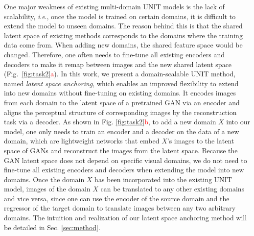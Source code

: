 \documentclass[10pt,journal,compsoc]{IEEEtran}
\newcommand{\red}[1]{\textcolor{red}{#1}}
\newcommand{\ie}{\textit{i}.\textit{e}.}
\begin{document}
One major weakness of existing multi-domain UNIT models is the lack of scalability, \ie, once the model is trained on certain domains, it is difficult to extend the model to unseen domains.
The reason behind this is that the shared latent space of existing methods corresponds to the domains where the training data come from. When adding new domains, the shared feature space would be changed. Therefore, one often needs to fine-tune all existing encoders and decoders to make it remap between images and the new shared latent space (Fig.~\ref{fig:task2}\red{a}). 
In this work, we present a domain-scalable UNIT method, named \emph{latent space anchoring}, which enables an improved flexibility to extend into new domains without fine-tuning on existing domains. It encodes images from each domain to the latent space of a pretrained GAN via an encoder and aligns the perceptual structure of corresponding images by the reconstruction task via a decoder. As shown in Fig. \ref{fig:task2}\red{b}, to add a new domain $X$ into our model, one only needs to train an encoder and a decoder on the data of a new domain, which are lightweight networks that embed $X$'s images to the latent space of GANs and reconstruct the images from the latent space. 
Because the GAN latent space does not depend on specific visual domains, we do not need to fine-tune all existing encoders and decoders when extending the model into new domains.
Once the domain $X$ has been incorporated into the existing UNIT model, images of the domain $X$ can be translated to any other existing domains and vice versa, since one can use the encoder of the source domain and the regressor of the target domain to translate images between any two arbitrary domains. 
The intuition and realization of our latent space anchoring method will be detailed in Sec. \ref{sec:method}.
\end{document}
